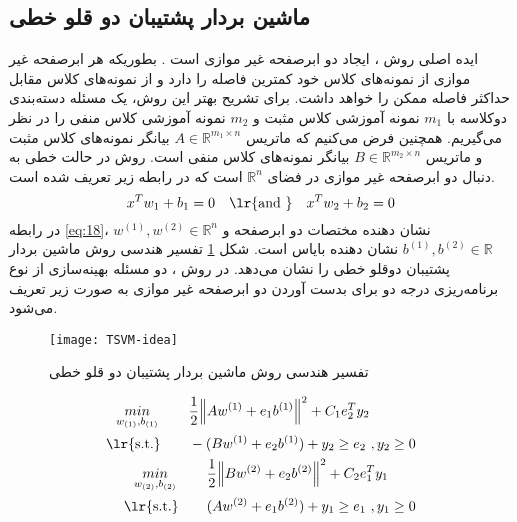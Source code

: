 \subsection{ماشین بردار پشتیبان دو قلو خطی}\label{sec:2:2:1}
ایده اصلی روش ، ایجاد دو ابرصفحه غیر موازی است \cite{jayadeva2007}. بطوریکه هر ابرصفحه غیر موازی از نمونه‌های کلاس خود کمترین فاصله را دارد و از نمونه‌های کلاس مقابل حداکثر فاصله ممکن را خواهد داشت. برای تشریح بهتر این روش، یک مسئله دسته‌بندی دوکلاسه با $m_1$  نمونه آموزشی کلاس مثبت و  $m_2$ نمونه آموزشی کلاس منفی را در نظر می‌گیریم. همچنین فرض می‌کنیم که ماتریس   $A\in {{\mathbb{R}}^{{{m}_{1}}\times n}}$ بیانگر نمونه‌های کلاس مثبت و ماتریس  $B\in {{\mathbb{R}}^{{{m}_{2}}\times n}}$ بیانگر نمونه‌های کلاس منفی است. روش  در حالت خطی به دنبال دو ابرصفحه غیر موازی در فضای  ${{\mathbb{R}}^{n}}$ است که در رابطه زیر تعریف شده است.
\begin{equation}
{{x}^T}{{w}_{1}}+{{b}_{1}}=0 \quad \textrm{\lr{and }} \quad {{x}^T}{{w}_{2}}+{{b}_{2}}=0
\label{eq:18}
\end{equation}
در رابطه \ref{eq:18}،  ${{w}^{(1)}},{{w}^{(2)}}\in {{\mathbb{R}}^{n}}$ نشان دهنده مختصات دو ابرصفحه و  ${{b}^{(1)}},{{b}^{(2)}}\in {\mathbb{R}}$ نشان دهنده بایاس است. شکل \ref{fig:TSVM-idea} تفسیر هندسی روش ماشین بردار پشتیبان دوقلو خطی را نشان می‌دهد. در روش ، دو مسئله بهینه‌سازی از نوع برنامه‌ریزی درجه دو برای بدست آوردن دو ابرصفحه غیر موازی به صورت زیر تعریف می‌شود.
\begin{figure}[!t]
	\centering
	\texttt{[image: TSVM-idea]}
	\caption{تفسیر هندسی روش ماشین بردار پشتیبان دو قلو خطی}
	\label{fig:TSVM-idea}
\end{figure}
\begin{align}
\label{eq:19}
\begin{split}
\underset{{{w}_{(1)}},{{b}_{(1)}}}{\mathop{min}}\,\qquad  & \frac{1}{2}{{\left\| A{{w}^{(1)}}+{{e}_{1}}{{b}^{(1)}} \right\|}^{2}}+{{C}_{1}}e_{2}^{T}{{y}_{2}}  \\
\text{\lr{s.t.}} \qquad  & -(B{{w}^{(1)}}+{{e}_{2}}{{b}^{(1)}})+{{y}_{2}}\ge {{e}_{2}}\text{ },{{y}_{2}}\ge 0  
\end{split} \\
\label{eq:20}
\begin{split}
\underset{{{w}_{(2)}},{{b}_{(2)}}}{\mathop{min}}\,\qquad  & \frac{1}{2}{{\left\| B{{w}^{(2)}}+{{e}_{2}}{{b}^{(2)}} \right\|}^{2}}+{{C}_{2}}e_{1}^{T}{{y}_{1}}  \\
\text{\lr{s.t.}} \qquad  & (A{{w}^{(2)}}+{{e}_{1}}{{b}^{(2)}})+{{y}_{1}}\ge {{e}_{1}}\text{ },{{y}_{1}}\ge 0  
\end{split}
\end{align}
